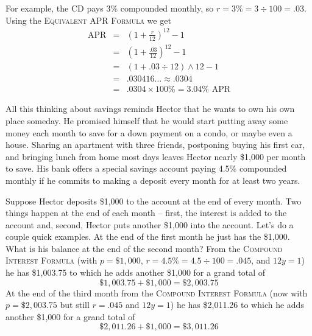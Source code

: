  \bigskip
\bigskip

For example, the CD pays 3\% compounded monthly, so $r=3\% = 3 \div 100 = .03$.  Using the \textsc{Equivalent APR Formula} we get
\begin{eqnarray*}
\text{APR}  &= & \left(1+\frac{r}{12}\right)^{12}-1\\
& = &   \left(1+\frac{.03}{12}\right)^{12}-1\\
& =  & ( 1 + .03 \div 12 ) \wedge 12 -1  \\
& =  & .030416\ldots  \approx .0304 \\
& = & .0304 \times 100\% = 3.04\% \text{ APR}
\end{eqnarray*}

All this thinking about savings reminds Hector that he wants to own his own place someday.  He promised himself that he would start putting away some money each month to save for a down payment on a condo, or maybe even a house.  Sharing an apartment with three friends, postponing buying his first car, and bringing lunch from home most days leaves Hector nearly \$1,000 per month to save.  His bank offers a special savings account paying 4.5\% compounded monthly if he commits to making a deposit every month for at least two years.

Suppose Hector deposits \$1,000 to the account at the end of every month.  Two things happen at the end of each month -- first, the interest is added to the account and, second, Hector puts another \$1,000 into the account. Let's do a couple quick examples.  At the end of the first month he just has the \$1,000.  What is his balance at the end of the second month? From the \textsc{Compound Interest Formula} (with $p=\$1,000$, $r=4.5\% = 4.5 \div 100 = .045$, and $12y=1$) he has \$1,003.75 to which he adds another \$1,000 for a grand total of 
$$ \$1,003.75+  \$1,000= \$2,003.75$$
At the end of the third month from the \textsc{Compound Interest Formula} (now with $p=\$2,003.75$ but still $r=.045$ and $12y=1$) he has \$2,011.26 to which he adds another \$1,000 for a grand total of 
$$\$2,011.26 + \$1,000 = \$3,011.26$$

